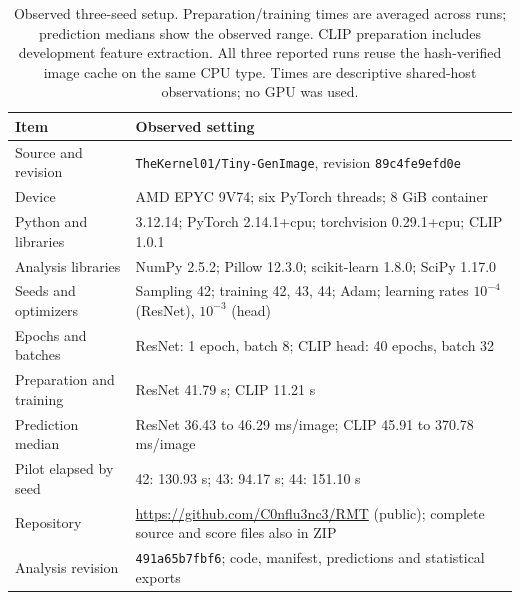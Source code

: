 \begin{table}[!htbp]
\caption{Observed three-seed setup. Preparation/training times are averaged across runs; prediction medians show the observed range. CLIP preparation includes development feature extraction. All three reported runs reuse the hash-verified image cache on the same CPU type. Times are descriptive shared-host observations; no GPU was used.}
\label{tab:reproducibility}
\centering
\small
\setlength{\tabcolsep}{3.2pt}\renewcommand{\arraystretch}{1.10}
\begin{tabularx}{\linewidth}{@{}lY@{}}
\toprule
Item & Observed setting\\
\midrule
Source and revision & \texttt{TheKernel01/Tiny-GenImage}, revision \texttt{89c4fe9efd0e}\\
Device & AMD EPYC 9V74; six PyTorch threads; 8 GiB container\\
Python and libraries & 3.12.14; PyTorch 2.14.1+cpu; torchvision 0.29.1+cpu; CLIP 1.0.1\\
Analysis libraries & NumPy 2.5.2; Pillow 12.3.0; scikit-learn 1.8.0; SciPy 1.17.0\\
Seeds and optimizers & Sampling 42; training 42, 43, 44; Adam; learning rates $10^{-4}$ (ResNet), $10^{-3}$ (head)\\
Epochs and batches & ResNet: 1 epoch, batch 8; CLIP head: 40 epochs, batch 32\\
Preparation and training & ResNet 41.79 s; CLIP 11.21 s\\
Prediction median & ResNet 36.43 to 46.29 ms/image; CLIP 45.91 to 370.78 ms/image\\
Pilot elapsed by seed & 42: 130.93 s; 43: 94.17 s; 44: 151.10 s\\
Repository & \url{https://github.com/C0nflu3nc3/RMT} (public); complete source and score files also in ZIP\\
Analysis revision & \texttt{491a65b7fbf6}; code, manifest, predictions and statistical exports\\
\bottomrule
\end{tabularx}
\end{table}
